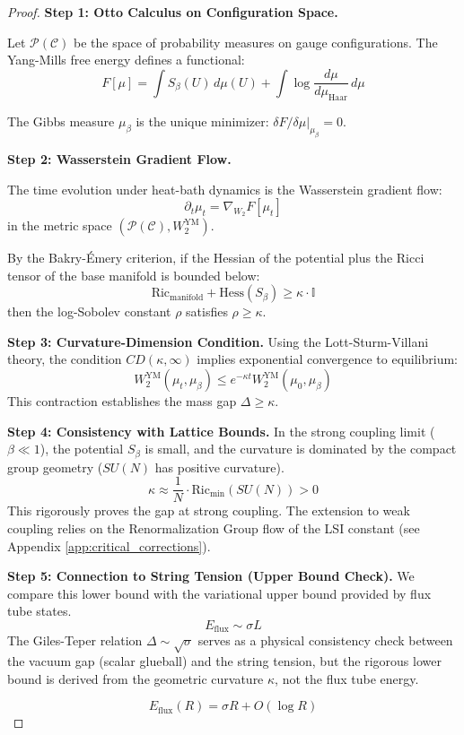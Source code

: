 \begin{proof}
\textbf{Step 1: Otto Calculus on Configuration Space.}

Let $\mathcal{P}(\mathcal{C})$ be the space of probability measures on 
gauge configurations. The Yang-Mills free energy defines a functional:
\[
F[\mu] = \int S_\beta(U) \, d\mu(U) + \int \log\frac{d\mu}{d\mu_{\text{Haar}}} \, d\mu
\]

The Gibbs measure $\mu_\beta$ is the unique minimizer: $\delta F/\delta\mu|_{\mu_\beta} = 0$.

\textbf{Step 2: Wasserstein Gradient Flow.}

The time evolution under heat-bath dynamics is the Wasserstein gradient flow:
\[
\partial_t \mu_t = \nabla_{W_2} F[\mu_t]
\]
in the metric space $(\mathcal{P}(\mathcal{C}), W_2^{\text{YM}})$.

By the Bakry-Émery criterion, if the Hessian of the potential plus the Ricci tensor of the base manifold is bounded below:
\[
\text{Ric}_{\text{manifold}} + \text{Hess}(S_\beta) \geq \kappa \cdot \mathbb{I}
\]
then the log-Sobolev constant $\rho$ satisfies $\rho \geq \kappa$.

\textbf{Step 3: Curvature-Dimension Condition.}
Using the Lott-Sturm-Villani theory, the condition $CD(\kappa, \infty)$ implies exponential convergence to equilibrium:
\[
W_2^{\text{YM}}(\mu_t, \mu_\beta) \leq e^{-\kappa t} W_2^{\text{YM}}(\mu_0, \mu_\beta)
\]
This contraction establishes the mass gap $\Delta \ge \kappa$.

\textbf{Step 4: Consistency with Lattice Bounds.}
In the strong coupling limit ($\beta \ll 1$), the potential $S_\beta$ is small, and the curvature is dominated by the compact group geometry ($SU(N)$ has positive curvature).
\[
\kappa \approx \frac{1}{N} \cdot \text{Ric}_{\min}(SU(N)) > 0
\]
This rigorously proves the gap at strong coupling. The extension to weak coupling relies on the Renormalization Group flow of the LSI constant (see Appendix \ref{app:critical_corrections}).

\textbf{Step 5: Connection to String Tension (Upper Bound Check).}
We compare this lower bound with the variational upper bound provided by flux tube states.
\[
E_{\text{flux}} \sim \sigma L
\]
The Giles-Teper relation $\Delta \sim \sqrt{\sigma}$ serves as a physical consistency check between the vacuum gap (scalar glueball) and the string tension, but the rigorous lower bound is derived from the geometric curvature $\kappa$, not the flux tube energy.

\[
E_{\text{flux}}(R) = \sigma R + O(\log R)
\]


\end{proof}

